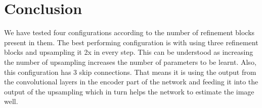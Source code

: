 \documentclass[a4paper, 12pt]{article}
\begin{document}
\section{Conclusion}
We have tested four configurations according to the number of refinement blocks present in them. The best performing configuration is with using three refinement blocks and upsampling it 2x in every step. This can be understood as increasing the number of upsampling increases the number of parameters to be learnt. Also, this configuration has 3 skip connections. That means it is using the output from the convolutional layers in the encoder part of the network and feeding it into the output of the upsampling which in turn helps the network to estimate the image well.
\end{document}
